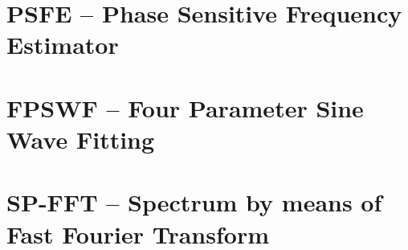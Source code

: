 \documentclass[12pt,a4paper,oneside]{report} %
\begin{document}
\section*{\infosection} %

\section*{\examplesection} %


\chapter{PSFE -- Phase Sensitive Frequency Estimator} %
\section*{\infosection} %

\section*{\examplesection} %


\chapter{FPSWF -- Four Parameter Sine Wave Fitting} %
\section*{\infosection} %

\section*{\examplesection} %


\chapter{SP-FFT -- Spectrum by means of Fast Fourier Transform} %
\end{document}
